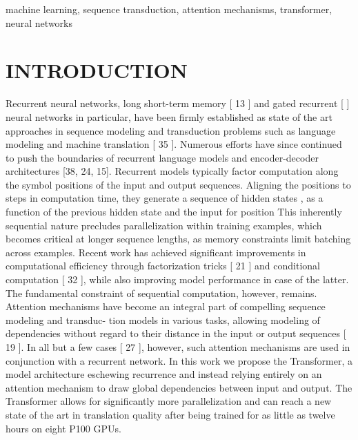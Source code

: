 \documentclass[conference]{IEEEtran}
\begin{document}
\begin{IEEEkeywords}
machine learning, sequence transduction, attention mechanisms, transformer, neural networks
\end{IEEEkeywords}

\section{INTRODUCTION}
Recurrent neural networks, long short-term memory [ 13 ] and gated recurrent [ ] neural networks in particular, have been firmly established as state of the art approaches in sequence modeling and transduction problems such as language modeling and machine translation [ 35 ]. Numerous efforts have since continued to push the boundaries of recurrent language models and encoder-decoder architectures [38, 24, 15]. Recurrent models typically factor computation along the symbol positions of the input and output sequences. Aligning the positions to steps in computation time, they generate a sequence of hidden states , as a function of the previous hidden state and the input for position This inherently sequential nature precludes parallelization within training examples, which becomes critical at longer sequence lengths, as memory constraints limit batching across examples. Recent work has achieved significant improvements in computational efficiency through factorization tricks [ 21 ] and conditional computation [ 32 ], while also improving model performance in case of the latter. The fundamental constraint of sequential computation, however, remains. Attention mechanisms have become an integral part of compelling sequence modeling and transduc- tion models in various tasks, allowing modeling of dependencies without regard to their distance in the input or output sequences [ 19 ]. In all but a few cases [ 27 ], however, such attention mechanisms are used in conjunction with a recurrent network. In this work we propose the Transformer, a model architecture eschewing recurrence and instead relying entirely on an attention mechanism to draw global dependencies between input and output. The Transformer allows for significantly more parallelization and can reach a new state of the art in translation quality after being trained for as little as twelve hours on eight P100 GPUs.
\end{document}
